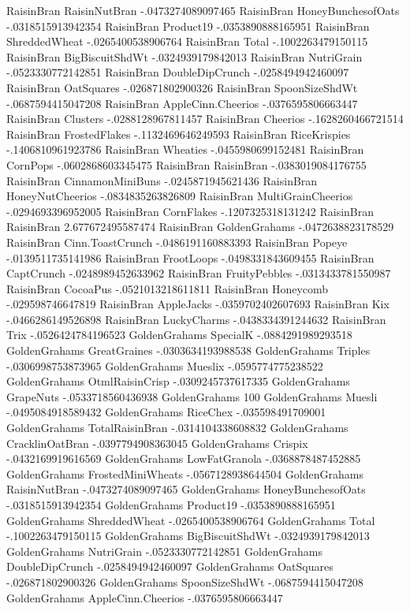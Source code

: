 RaisinBran	RaisinNutBran	-.0473274089097465
RaisinBran	HoneyBunchesofOats	-.0318515913942354
RaisinBran	Product19	-.0353890888165951
RaisinBran	ShreddedWheat	-.0265400538906764
RaisinBran	Total	-.1002263479150115
RaisinBran	BigBiscuitShdWt	-.0324939179842013
RaisinBran	NutriGrain	-.0523330772142851
RaisinBran	DoubleDipCrunch	-.0258494942460097
RaisinBran	OatSquares	-.026871802900326
RaisinBran	SpoonSizeShdWt	-.0687594415047208
RaisinBran	AppleCinn.Cheerios	-.0376595806663447
RaisinBran	Clusters	-.0288128967811457
RaisinBran	Cheerios	-.1628260466721514
RaisinBran	FrostedFlakes	-.1132469646249593
RaisinBran	RiceKrispies	-.1406810961923786
RaisinBran	Wheaties	-.0455980699152481
RaisinBran	CornPops	-.0602868603345475
RaisinBran	RaisinBran	-.0383019084176755
RaisinBran	CinnamonMiniBuns	-.0245871945621436
RaisinBran	HoneyNutCheerios	-.0834835263826809
RaisinBran	MultiGrainCheerios	-.0294693396952005
RaisinBran	CornFlakes	-.1207325318131242
RaisinBran	RaisinBran	2.677672495587474
RaisinBran	GoldenGrahams	-.0472638823178529
RaisinBran	Cinn.ToastCrunch	-.0486191160883393
RaisinBran	Popeye	-.0139511735141986
RaisinBran	FrootLoops	-.0498331843609455
RaisinBran	CaptCrunch	-.0248989452633962
RaisinBran	FruityPebbles	-.0313433781550987
RaisinBran	CocoaPus	-.0521013218611811
RaisinBran	Honeycomb	-.029598746647819
RaisinBran	AppleJacks	-.0359702402607693
RaisinBran	Kix	-.0466286149526898
RaisinBran	LuckyCharms	-.0438334391244632
RaisinBran	Trix	-.0526424784196523
GoldenGrahams	SpecialK	-.0884291989293518
GoldenGrahams	GreatGraines	-.0303634193988538
GoldenGrahams	Triples	-.0306998753873965
GoldenGrahams	Mueslix	-.0595774775238522
GoldenGrahams	OtmlRaisinCrisp	-.0309245737617335
GoldenGrahams	GrapeNuts	-.0533718560436938
GoldenGrahams	100%
GoldenGrahams	Muesli	-.0495084918589432
GoldenGrahams	RiceChex	-.035598491709001
GoldenGrahams	TotalRaisinBran	-.0314104338608832
GoldenGrahams	CracklinOatBran	-.0397794908363045
GoldenGrahams	Crispix	-.0432169919616569
GoldenGrahams	LowFatGranola	-.0368878487452885
GoldenGrahams	FrostedMiniWheats	-.0567128938644504
GoldenGrahams	RaisinNutBran	-.0473274089097465
GoldenGrahams	HoneyBunchesofOats	-.0318515913942354
GoldenGrahams	Product19	-.0353890888165951
GoldenGrahams	ShreddedWheat	-.0265400538906764
GoldenGrahams	Total	-.1002263479150115
GoldenGrahams	BigBiscuitShdWt	-.0324939179842013
GoldenGrahams	NutriGrain	-.0523330772142851
GoldenGrahams	DoubleDipCrunch	-.0258494942460097
GoldenGrahams	OatSquares	-.026871802900326
GoldenGrahams	SpoonSizeShdWt	-.0687594415047208
GoldenGrahams	AppleCinn.Cheerios	-.0376595806663447
